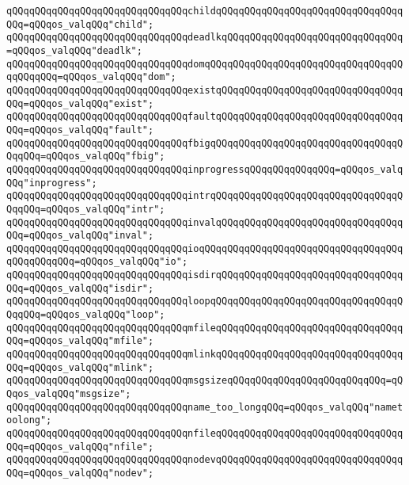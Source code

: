 \verb|qQQqqQQqqQQqqQQqqQQqqQQqqQQqqQQqchildqQQqqQQqqQQqqQQqqQQqqQQqqQQqqQQqqQQq=qQQqos_valqQQq"child";|\newline
\verb|qQQqqQQqqQQqqQQqqQQqqQQqqQQqqQQqdeadlkqQQqqQQqqQQqqQQqqQQqqQQqqQQqqQQq=qQQqos_valqQQq"deadlk";|\newline
\verb|qQQqqQQqqQQqqQQqqQQqqQQqqQQqqQQqdomqQQqqQQqqQQqqQQqqQQqqQQqqQQqqQQqqQQqqQQqqQQq=qQQqos_valqQQq"dom";|\newline
\verb|qQQqqQQqqQQqqQQqqQQqqQQqqQQqqQQqexistqQQqqQQqqQQqqQQqqQQqqQQqqQQqqQQqqQQq=qQQqos_valqQQq"exist";|\newline
\verb|qQQqqQQqqQQqqQQqqQQqqQQqqQQqqQQqfaultqQQqqQQqqQQqqQQqqQQqqQQqqQQqqQQqqQQq=qQQqos_valqQQq"fault";|\newline
\verb|qQQqqQQqqQQqqQQqqQQqqQQqqQQqqQQqfbigqQQqqQQqqQQqqQQqqQQqqQQqqQQqqQQqqQQqqQQq=qQQqos_valqQQq"fbig";|\newline
\verb|qQQqqQQqqQQqqQQqqQQqqQQqqQQqqQQqinprogressqQQqqQQqqQQqqQQq=qQQqos_valqQQq"inprogress";|\newline
\verb|qQQqqQQqqQQqqQQqqQQqqQQqqQQqqQQqintrqQQqqQQqqQQqqQQqqQQqqQQqqQQqqQQqqQQqqQQq=qQQqos_valqQQq"intr";|\newline
\verb|qQQqqQQqqQQqqQQqqQQqqQQqqQQqqQQqinvalqQQqqQQqqQQqqQQqqQQqqQQqqQQqqQQqqQQq=qQQqos_valqQQq"inval";|\newline
\verb|qQQqqQQqqQQqqQQqqQQqqQQqqQQqqQQqioqQQqqQQqqQQqqQQqqQQqqQQqqQQqqQQqqQQqqQQqqQQqqQQq=qQQqos_valqQQq"io";|\newline
\verb|qQQqqQQqqQQqqQQqqQQqqQQqqQQqqQQqisdirqQQqqQQqqQQqqQQqqQQqqQQqqQQqqQQqqQQq=qQQqos_valqQQq"isdir";|\newline
\verb|qQQqqQQqqQQqqQQqqQQqqQQqqQQqqQQqloopqQQqqQQqqQQqqQQqqQQqqQQqqQQqqQQqqQQqqQQq=qQQqos_valqQQq"loop";|\newline
\verb|qQQqqQQqqQQqqQQqqQQqqQQqqQQqqQQqmfileqQQqqQQqqQQqqQQqqQQqqQQqqQQqqQQqqQQq=qQQqos_valqQQq"mfile";|\newline
\verb|qQQqqQQqqQQqqQQqqQQqqQQqqQQqqQQqmlinkqQQqqQQqqQQqqQQqqQQqqQQqqQQqqQQqqQQq=qQQqos_valqQQq"mlink";|\newline
\verb|qQQqqQQqqQQqqQQqqQQqqQQqqQQqqQQqmsgsizeqQQqqQQqqQQqqQQqqQQqqQQqqQQq=qQQqos_valqQQq"msgsize";|\newline
\verb|qQQqqQQqqQQqqQQqqQQqqQQqqQQqqQQqname_too_longqQQq=qQQqos_valqQQq"nametoolong";|\newline
\verb|qQQqqQQqqQQqqQQqqQQqqQQqqQQqqQQqnfileqQQqqQQqqQQqqQQqqQQqqQQqqQQqqQQqqQQq=qQQqos_valqQQq"nfile";|\newline
\verb|qQQqqQQqqQQqqQQqqQQqqQQqqQQqqQQqnodevqQQqqQQqqQQqqQQqqQQqqQQqqQQqqQQqqQQq=qQQqos_valqQQq"nodev";|\newline
